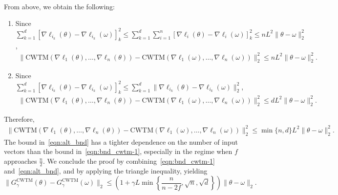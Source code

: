 \documentclass[twoside,11pt]{article}
\begin{document}
        From above, we obtain the following:
    \begin{enumerate}
        \item Since $\sum_{k=1}^d {\left[ \nabla \ell_{i_k} (\theta) - \nabla \ell_{i_k} (\omega) \right]}_k^2
        \leq \sum_{k=1}^d \sum_{i=1}^n {\left[ \nabla \ell_i (\theta) - \nabla \ell_i (\omega) \right]}_k^2
        \leq n L^2 \| \theta - \omega \|_2^2$,
        \begin{align*}
            \| \mathrm{CWTM}(\nabla \ell_1 (\theta), \ldots, \nabla \ell_n (\theta)) - \mathrm{CWTM}(\nabla \ell_1 (\omega), \ldots, \nabla \ell_n (\omega)) \|_2^2 \leq n L^2 \| \theta - \omega \|_2^2. 
        \end{align*}
        \item Since $\sum_{k=1}^d {\left[ \nabla \ell_{i_k} (\theta) - \nabla \ell_{i_k} (\omega) \right]}_k^2 \leq \sum_{k=1}^d \| \nabla \ell_{i_k} (\theta) - \nabla \ell_{i_k} (\omega) \|^2_2$,
        \begin{align*}
            \| \mathrm{CWTM}(\nabla \ell_1 (\theta), \ldots, \nabla \ell_n (\theta)) - \mathrm{CWTM}(\nabla \ell_1 (\omega), \ldots, \nabla \ell_n (\omega)) \|_2^2 \leq d L^2 \| \theta - \omega \|_2^2. 
        \end{align*}
    \end{enumerate}
    Therefore, 
    \begin{align}
        \| \mathrm{CWTM}(\nabla \ell_1 (\theta), \ldots, \nabla \ell_n (\theta)) - \mathrm{CWTM}(\nabla \ell_1 (\omega), \ldots, \nabla \ell_n (\omega)) \|_2^2 \leq \min\{n, d\} L^2 \| \theta - \omega \|_2^2. \label{eqn:alt_bnd}
    \end{align}
    The bound in~\eqref{eqn:alt_bnd} has a tighter dependence on the number of input vectors than the bound in~\eqref{eqn:bnd_cwtm-1}, especially in the regime when $f$ approaches $\frac{n}{2}$.
    We conclude the proof by combining~\eqref{eqn:bnd_cwtm-1} and~\eqref{eqn:alt_bnd}, and by applying the triangle inequality, yielding
    \begin{equation*}\label{eq:cwtm-expansiveness}
        \| G^{\mathrm{CWTM}}_{\gamma}(\theta) - G^{\mathrm{CWTM}}_{\gamma}(\omega) \|_2 \leq  \left(1 + \gamma L \min \left\{\frac{n}{n-2f}, \sqrt{n}, \sqrt{d } \right\} \right) \| \theta - \omega \|_2. 
        \tag*{\BlackBox}
    \end{equation*}
\end{document}
